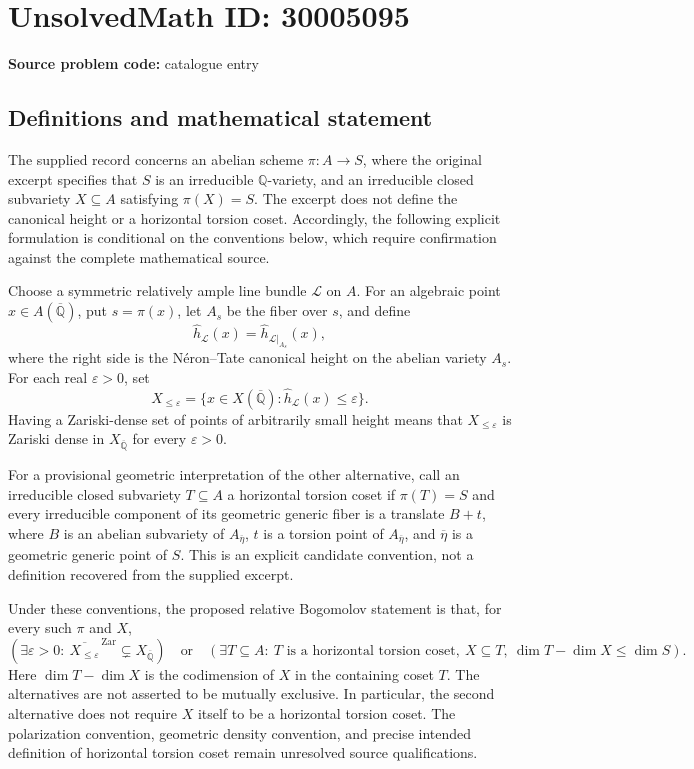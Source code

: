 \documentclass[11pt]{article}
\newcommand{\Q}{\mathbb{Q}}
\begin{document}
\section*{UnsolvedMath ID: 30005095}
\textbf{Source problem code:} catalogue entry
\subsection{Definitions and mathematical statement}
The supplied record concerns an abelian scheme \(\pi:A\to S\), where the original excerpt specifies that \(S\) is an irreducible \(\Q\)-variety, and an irreducible closed subvariety \(X\subseteq A\) satisfying \(\pi(X)=S\). The excerpt does not define the canonical height or a horizontal torsion coset. Accordingly, the following explicit formulation is conditional on the conventions below, which require confirmation against the complete mathematical source.

Choose a symmetric relatively ample line bundle \(\mathcal L\) on \(A\). For an algebraic point \(x\in A(\overline{\Q})\), put \(s=\pi(x)\), let \(A_s\) be the fiber over \(s\), and define
\[
\widehat h_{\mathcal L}(x)=\widehat h_{\mathcal L|_{A_s}}(x),
\]
where the right side is the N\'eron--Tate canonical height on the abelian variety \(A_s\). For each real \(\varepsilon>0\), set
\[
X_{\leq\varepsilon}=\{x\in X(\overline{\Q}):\widehat h_{\mathcal L}(x)\leq\varepsilon\}.
\]
Having a Zariski-dense set of points of arbitrarily small height means that \(X_{\leq\varepsilon}\) is Zariski dense in \(X_{\overline{\Q}}\) for every \(\varepsilon>0\).

For a provisional geometric interpretation of the other alternative, call an irreducible closed subvariety \(T\subseteq A\) a horizontal torsion coset if \(\pi(T)=S\) and every irreducible component of its geometric generic fiber is a translate \(B+t\), where \(B\) is an abelian subvariety of \(A_{\overline\eta}\), \(t\) is a torsion point of \(A_{\overline\eta}\), and \(\overline\eta\) is a geometric generic point of \(S\). This is an explicit candidate convention, not a definition recovered from the supplied excerpt.

Under these conventions, the proposed relative Bogomolov statement is that, for every such \(\pi\) and \(X\),
\[
\left(\exists\varepsilon>0:\ 
\overline{X_{\leq\varepsilon}}^{\,\mathrm{Zar}}
\subsetneq X_{\overline{\Q}}\right)
\quad\text{or}\quad
\left(\exists T\subseteq A:\ T\text{ is a horizontal torsion coset},\ 
X\subseteq T,\ 
\dim T-\dim X\leq\dim S\right).
\]
Here \(\dim T-\dim X\) is the codimension of \(X\) in the containing coset \(T\). The alternatives are not asserted to be mutually exclusive. In particular, the second alternative does not require \(X\) itself to be a horizontal torsion coset. The polarization convention, geometric density convention, and precise intended definition of horizontal torsion coset remain unresolved source qualifications.
\end{document}
